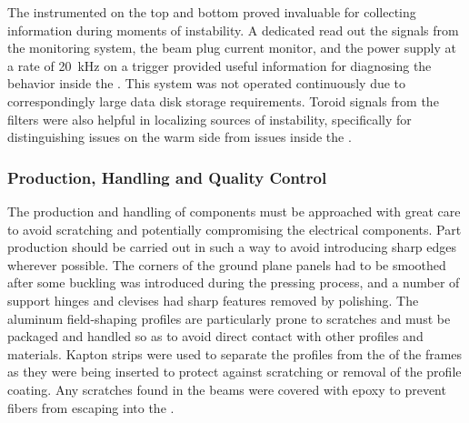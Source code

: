 The instrumented  on the top and bottom  proved invaluable for collecting information during moments of instability.
A dedicated  read out the signals from the  monitoring system, the beam plug current monitor, and the power supply at a rate of \SI{20}{kHz} on a trigger provided useful information for diagnosing the  behavior inside the .
This system was not operated continuously due to correspondingly large data disk storage requirements.
Toroid signals from the  filters were also helpful in localizing sources of instability, specifically for distinguishing issues on the warm side from issues inside the .





\subsubsection{Production, Handling and Quality Control}
\label{sec:fdsp-hv-protodune-lessons-prod}

The production and handling of  components must be approached with %
great care to avoid scratching and potentially compromising the electrical components. %
Part production should be carried out in such a way to avoid introducing sharp edges wherever possible.
The corners of the ground plane panels had to be smoothed after some buckling was introduced during the pressing process, and a number of support hinges and clevises had sharp features removed by polishing.
The aluminum field-shaping profiles are particularly prone to scratches and must be packaged and handled so as to avoid direct contact with other profiles and materials.
Kapton strips were used to separate the profiles from the  of the  frames as they were being inserted to protect against scratching or removal of the profile coating.
Any scratches found in the  beams were covered with epoxy to prevent fibers from escaping into the .

